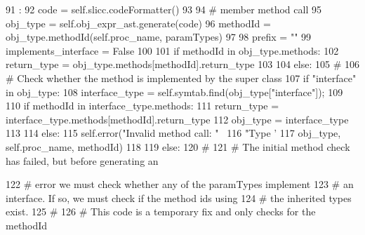 \begin{DoxyCode}
91                                          :
92         code = self.slicc.codeFormatter()
93 
94         # member method call
95         obj_type = self.obj_expr_ast.generate(code)
96         methodId = obj_type.methodId(self.proc_name, paramTypes)
97 
98         prefix = ""
99         implements_interface = False
100 
101         if methodId in obj_type.methods:
102             return_type = obj_type.methods[methodId].return_type
103 
104         else:
105             #
106             # Check whether the method is implemented by the super class
107             if "interface" in obj_type:
108                 interface_type = self.symtab.find(obj_type["interface"]);
109 
110                 if methodId in interface_type.methods:
111                     return_type = interface_type.methods[methodId].return_type
112                     obj_type = interface_type
113 
114                 else:
115                     self.error("Invalid method call: " \
116                                "Type '%
117                                obj_type, self.proc_name, methodId)
118 
119             else:
120                   #
121                   # The initial method check has failed, but before generating an
      
122                   # error we must check whether any of the paramTypes implement
123                   # an interface.  If so, we must check if the method ids using
124                   # the inherited types exist.
125                   #
126                   # This code is a temporary fix and only checks for the methodId
      

\end{DoxyCode}
